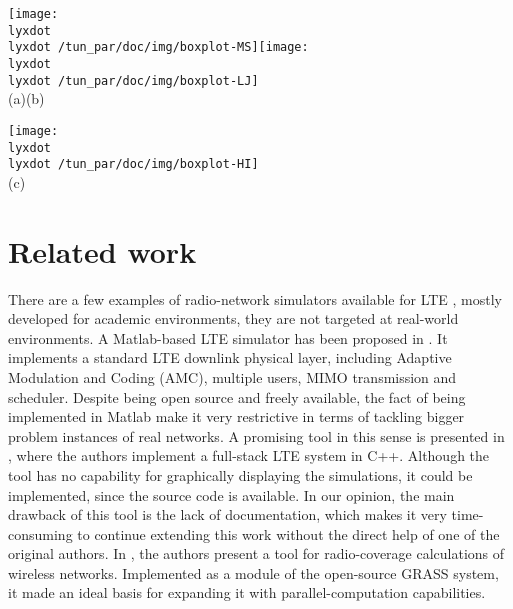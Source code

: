 \begin{figure*}[tp]
\centering

\texttt{[image: \\lyxdot \\lyxdot /tun\_par/doc/img/boxplot-MS]}\texttt{[image: \\lyxdot \\lyxdot /tun\_par/doc/img/boxplot-LJ]}\\\hspace*{0.2in}(a)\hspace*{3.2in}(b)
\end{figure*}


\begin{figure*}[tp]
\centering

\texttt{[image: \\lyxdot \\lyxdot /tun\_par/doc/img/boxplot-HI]}\\\hspace*{0.2in}(c)

\caption{Box plots showing the statistical analysis values of Table \ref{tab:Solutions-analysis},
showing the solutions of the clutter-optimization process for each
test network: (a) Net$_{1}$; (b) Net$_{2}$; (c) Net$_{3}$.\label{fig:boxplot}}
\end{figure*}



\section{Related work}\label{sec:Related-work}

There are a few examples of radio-network simulators available for
LTE \cite{Mehlfuhrer_The_Vienna_LTE_Simulators_enabling_reproducibility_in_wireless_communications_research:2011,Piro_Simulating_LTE_cellular_systems_an_open_source_framework:2011,Sanchez_Performance_evaluation_of_OFDMA_wireless_systems_using_WM_SIM:2006},
mostly developed for academic environments, they are not targeted
at real-world environments. A Matlab-based LTE simulator has been
proposed in \cite{Mehlfuhrer_The_Vienna_LTE_Simulators_enabling_reproducibility_in_wireless_communications_research:2011}.
It implements a standard LTE downlink physical layer, including Adaptive
Modulation and Coding (AMC), multiple users, MIMO transmission and
scheduler. Despite being open source and freely available, the fact
of being implemented in Matlab make it very restrictive in terms of
tackling bigger problem instances of real networks. A promising tool
in this sense is presented in \cite{Piro_Simulating_LTE_cellular_systems_an_open_source_framework:2011},
where the authors implement a full-stack LTE system in C++. Although
the tool has no capability for graphically displaying the simulations,
it could be implemented, since the source code is available. In our
opinion, the main drawback of this tool is the lack of documentation,
which makes it very time-consuming to continue extending this work
without the direct help of one of the original authors. In \cite{Ozimek_Open.source.radio.coverage.prediction:2010},
the authors present a tool for radio-coverage calculations of wireless
networks. Implemented as a module of the open-source GRASS system,
it made an ideal basis for expanding it with parallel-computation
capabilities.

